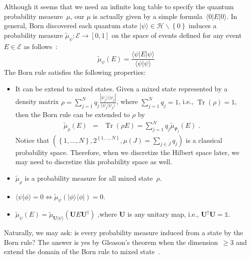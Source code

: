 \documentclass{article}
\theoremstyle{remark}
\newcommand{\qevents}{\ensuremath{\mathcal{E}}}
\newcommand{\pmeas}{\ensuremath{\mu}}
\newcommand{\Hilb}{\mathcal{H}}
\newcommand{\ket}[1]{|#1\rangle}
\newcommand{\ip}[2]{\langle #1 | #2 \rangle}
\newcommand{\proj}[1]{|#1 \rangle\langle #1 |}
\newcommand{\yutsung}[1]{\fbox{\begin{minipage}{0.9\textwidth}\color{purple}{Yu-Tsung says: #1}\end{minipage}}}
\newcommand{\melement}[2]{ \langle #1 | #2 | #1 \rangle}
\newcommand{\Tr}{\mathop{\mathrm{Tr}}\nolimits}
\begin{document}
Although it seems that we need an infinite long table to specify the
quantum probability measure~$\mu$, our $\mu$ is actually
given by a simple formula~$\melement{0}{E}$. In general, Born discovered
each quantum state $\ket{\psi}\in\Hilb\backslash\left\{ 0\right\} $
induces a probability measure $\tilde{\mu}_{\psi}:\qevents\rightarrow[0,1]$
on the space of events defined for any event $E\in\qevents$ as follows~\cite{Born1984,Mermin2007}:
\begin{equation}
\tilde{\mu}_{\psi}(E)=\frac{\melement{\psi}{E}}{\ip{\psi}{\psi}}\label{eq:Born}
\end{equation}
The Born rule satisfies the following properties:
\begin{itemize}
\item It can be extend to mixed states. Given a mixed state represented
by a density matrix $\rho=\sum_{j=1}^{N}q_{j}\frac{\proj{\psi_{j}}}{\ip{\psi_{j}}{\psi_{j}}}$,
where $\sum_{j=1}^{N}q_{j}=1$, i.e., $\Tr\left(\rho\right)=1$, then
the Born rule can be extended to $\rho$ by 
\begin{eqnarray}
\tilde{\mu}_{\rho}\left(E\right) & = & \Tr\left(\rho E\right)=\sum_{j=1}^{N}q_{j}\tilde{\mu}_{\Psi_{j}}\left(E\right)\textrm{ .}\label{BornRule.mixed}
\end{eqnarray}
Notice that $\left(\left\{ 1,\ldots,N\right\} ,2^{\left\{ 1,\ldots,N\right\} },\pmeas\left(J\right)=\sum_{j\in J}q_{j}\right)$
is a classical probability space. Therefore, when we discretize the
Hilbert space later, we may need to discretize this probability space
as well.\yutsung{Check!!!}
\item $\tilde{\mu}_{\rho}$ is a probability measure for all mixed state~$\rho$.
\item $\ip{\psi}{\phi}=0\Leftrightarrow\tilde{\mu}_{\psi}\left(\proj{\phi}\right)=0$.
\item $\tilde{\mu}_{\psi}\left(E\right)=\tilde{\mu}_{\mathbf{U}\ket{\psi}}\left(\mathbf{U}E\mathbf{U}^{\dagger}\right)\textrm{ ,}$where
$\mathbf{U}$ is any unitary map, i.e., $\mathbf{U}^{\dagger}\mathbf{U}=\mathbb{1}$. 
\end{itemize}
\yutsung{...I think I need to check these properties identify an
unique Born rule in CQT or something...}

Naturally, we may ask: is every probability measure induced from a
state by the Born rule? The answer is yes by Gleason's theorem when
the dimension~$\ge3$ and extend the domain of the Born rule to mixed
state~\cite{gleason1957,peres1995quantum,Redhead1987-REDINA}.
\end{document}
